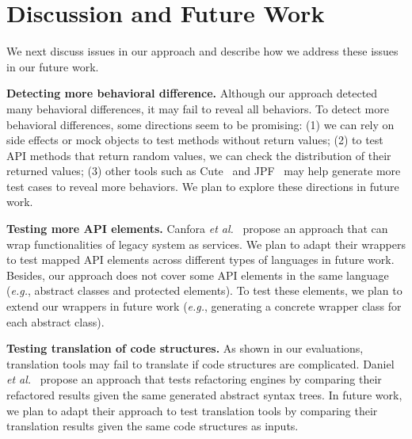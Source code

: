 

\section{Discussion and Future Work}
\label{sec:discuss}

We next discuss issues in our approach and describe how we address
these issues in our future work.

\textbf{Detecting more behavioral difference.} Although our approach detected many behavioral differences, it may fail to reveal all behaviors. To detect more behavioral differences, some directions seem to be promising: (1) we can rely on side effects or  mock objects to test methods without return values; (2) to test API methods that return random values, we can check the distribution of their returned values; (3) other tools such as Cute~\cite{koushik:cute} and JPF~\cite{visser2003mcp} may help generate more test cases to reveal more behaviors. We plan to explore these directions in future work.

\textbf{Testing more API elements.} Canfora \emph{et al.}~\cite{CanforaFFT08} propose an approach that can wrap functionalities of legacy system as services. We plan to adapt their wrappers to test mapped API elements across different types of languages in future work. Besides, our approach does not cover some API elements in the same language (\emph{e.g.}, abstract classes and protected elements). To test these elements, we plan to extend our wrappers in future work (\emph{e.g.}, generating a concrete wrapper class for each abstract class).

\textbf{Testing translation of code structures.} As shown in our evaluations, translation tools may fail to translate if code structures are complicated. Daniel \emph{et al.}~\cite{daniel2007automated} propose an approach that tests refactoring engines by comparing their refactored results given the same generated abstract syntax trees. In future work, we plan to adapt their approach to test translation tools by comparing their translation results given the same code structures as inputs.

